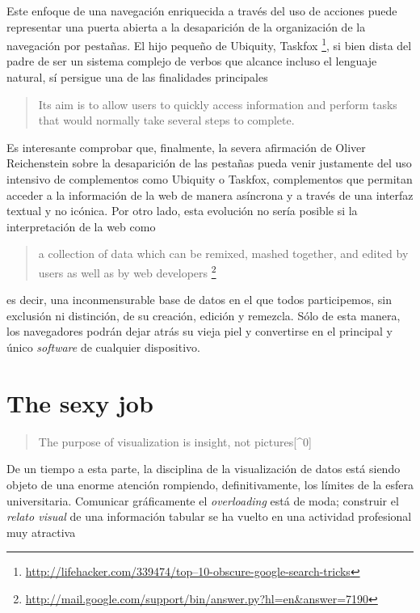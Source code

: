 \documentclass[12pt, a4paper,twoside]{book}
\newcommand{\chap}[1]{\newpage\thispagestyle{empty}\chapter{#1}\label{chap:\thechapter}}
\begin{document}
Este enfoque de una navegación enriquecida a través del uso de
acciones puede representar una puerta abierta a la desaparición de
la organización de la navegación por pestañas. El hijo pequeño de
Ubiquity, Taskfox%
\footnote{\href{http://lifehacker.com/339474/top-10-obscure-google-search-tricks}{http://lifehacker.com/339474/top--10-obscure-google-search-tricks}},
si bien dista del padre de ser un sistema complejo de verbos que
alcance incluso el lenguaje natural, sí persigue una de las
finalidades principales

\begin{quote}
Its aim is to allow users to quickly access information and perform
tasks that would normally take several steps to complete.

\end{quote}
Es interesante comprobar que, finalmente, la severa afirmación de
Oliver Reichenstein sobre la desaparición de las pestañas pueda
venir justamente del uso intensivo de complementos como Ubiquity o
Taskfox, complementos que permitan acceder a la información de la
web de manera asíncrona y a través de una interfaz textual y no
icónica. Por otro lado, esta evolución no sería posible si la
interpretación de la web como

\begin{quote}
a collection of data which can be remixed, mashed together, and
edited by users as well as by web developers%
\footnote{\href{http://mail.google.com/support/bin/answer.py?hl=en&answer=7190}{http://mail.google.com/support/bin/answer.py?hl=en\&answer=7190}}

\end{quote}
es decir, una inconmensurable base de datos en el que todos
participemos, sin exclusión ni distinción, de su creación, edición
y remezcla. Sólo de esta manera, los navegadores podrán dejar atrás
su vieja piel y convertirse en el principal y único \emph{software}
de cualquier dispositivo.

\chap{The sexy job}

\begin{quote}
The purpose of visualization is insight, not pictures[\^{}0]

\end{quote}
De un tiempo a esta parte, la disciplina de la visualización de
datos está siendo objeto de una enorme atención rompiendo,
definitivamente, los límites de la esfera universitaria. Comunicar
gráficamente el \emph{overloading} está de moda; construir el
\emph{relato visual} de una información tabular se ha vuelto en una
actividad profesional muy atractiva
\end{document}
